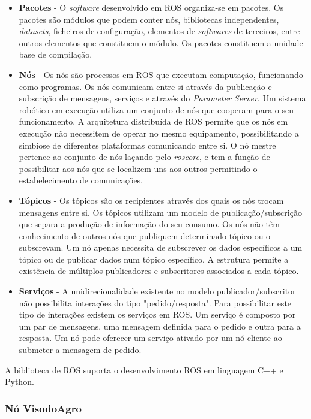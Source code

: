 \begin{itemize}
	\item \textbf{Pacotes} - O \textit{software} desenvolvido em ROS organiza-se em pacotes. Os pacotes são módulos que podem conter nós, bibliotecas independentes, \textit{datasets}, ficheiros de configuração, elementos de \textit{softwares} de terceiros, entre outros elementos que constituem o módulo. Os pacotes constituem a unidade base de compilação.
	\item \textbf{Nós} - Os nós são processos em ROS que executam computação, funcionando como programas. Os nós comunicam entre si através da publicação e subscrição de mensagens, serviços e através do \textit{Parameter Server}. Um sistema robótico em execução utiliza um conjunto de nós que cooperam para o seu funcionamento. A arquitetura distribuída de ROS permite que os nós em execução não necessitem de operar no mesmo equipamento, possibilitando a simbiose de diferentes plataformas comunicando entre si. O nó mestre pertence ao conjunto de nós laçando pelo \textit{roscore}, e tem a função de possibilitar aos nós que se localizem uns aos outros permitindo o estabelecimento de comunicações. 
	\item \textbf{Tópicos} - Os tópicos são os recipientes através dos quais os nós trocam mensagens entre si. Os tópicos utilizam um modelo de publicação/subscrição que separa a produção de informação do seu consumo. Os nós não têm conhecimento de outros nós que publiquem determinado tópico ou o subscrevam. Um nó apenas necessita de subscrever os dados específicos a um tópico ou de publicar dados num tópico específico. A estrutura permite a existência de múltiplos publicadores e subscritores associados a cada tópico.
	\item \textbf{Serviços} - A unidirecionalidade existente no modelo publicador/subscritor não possibilita interações do tipo "pedido/resposta". Para possibilitar este tipo de interações existem os serviços em ROS. Um serviço é composto por um par de mensagens, uma mensagem definida para o pedido e outra para a resposta. Um nó pode oferecer um serviço ativado por um nó cliente ao submeter a mensagem de pedido.
	
\end{itemize}

A biblioteca de ROS suporta o desenvolvimento ROS em linguagem C++ e Python.


\subsubsection{Nó VisodoAgro}

